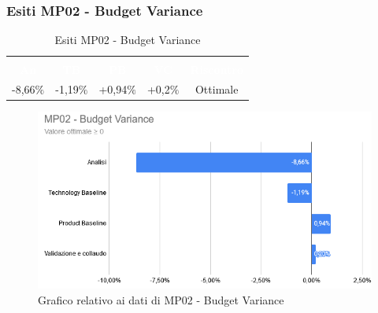 \subsubsection{Esiti MP02 - Budget Variance}
\begin{longtable}{c c c c c}
\rowcolor{white}\caption{Esiti MP02 - Budget Variance} \\
		\rowcolor{redafk}
\textcolor{white}{\textbf{An}} &
\textcolor{white}{\textbf{TB}} &
\textcolor{white}{\textbf{PB}} &
\textcolor{white}{\textbf{VC}} &
\textcolor{white}{\textbf{Riscontro}} \\
-8,66$\%$ &
-1,19$\%$ &
+0,94$\%$ &
+0,2$\%$ &
Ottimale \\
\end{longtable}

\begin{figure}[H]
\centering
\includegraphics[scale=0.7]{./img/MP02_budget_variance.png}
\caption{Grafico relativo ai dati di MP02 - Budget Variance}
\end{figure}

